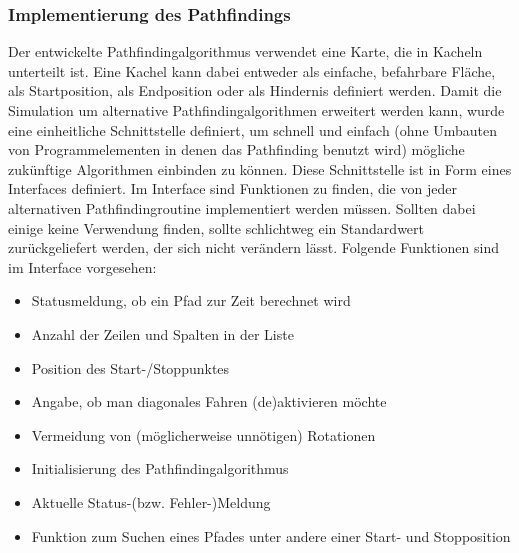 \subsubsection{Implementierung des Pathfindings}
Der entwickelte Pathfindingalgorithmus verwendet eine Karte, die in Kacheln unterteilt ist. Eine Kachel kann dabei entweder als einfache, befahrbare Fläche, als Startposition, als Endposition oder als Hindernis definiert werden. Damit die Simulation um alternative Pathfindingalgorithmen erweitert werden kann, wurde eine einheitliche Schnittstelle definiert, um schnell und einfach (ohne Umbauten von Programmelementen in denen das Pathfinding benutzt wird) mögliche zukünftige Algorithmen einbinden zu können. Diese Schnittstelle ist in Form eines Interfaces definiert. Im Interface sind Funktionen zu finden, die von jeder alternativen Pathfindingroutine implementiert werden müssen. Sollten dabei einige keine Verwendung finden, sollte schlichtweg ein Standardwert zurückgeliefert werden, der sich nicht verändern lässt. Folgende Funktionen sind im Interface vorgesehen:
\begin{itemize}
\item Statusmeldung, ob ein Pfad zur Zeit berechnet wird
\item Anzahl der Zeilen und Spalten in der Liste
\item Position des Start-/Stoppunktes
\item Angabe, ob man diagonales Fahren (de)aktivieren möchte
\item Vermeidung von (möglicherweise unnötigen) Rotationen
\item Initialisierung des Pathfindingalgorithmus
\item Aktuelle Status-(bzw. Fehler-)Meldung
\item Funktion zum Suchen eines Pfades unter andere einer Start- und Stopposition
\end{itemize}

